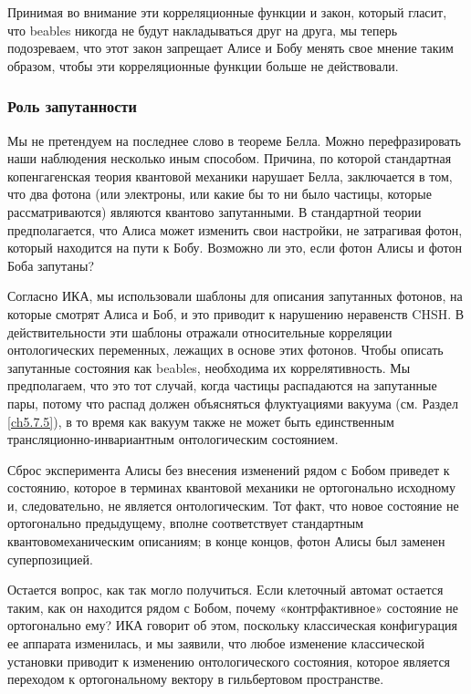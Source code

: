 \documentclass[main.tex]{subfiles}
\begin{document}
Принимая во внимание эти корреляционные функции и закон, который гласит, что beables никогда не будут накладываться друг на друга, мы теперь подозреваем, что этот закон запрещает Алисе и Бобу менять свое мнение таким образом, чтобы эти корреляционные функции больше не действовали.

\subsubsection{Роль запутанности}\label{ch10.3.1}

Мы не претендуем на последнее слово в теореме Белла. Можно перефразировать наши наблюдения несколько иным способом. Причина, по которой стандартная копенгагенская теория квантовой механики нарушает Белла, заключается в том, что два фотона (или электроны, или какие бы то ни было частицы, которые рассматриваются) являются квантово запутанными. В стандартной теории предполагается, что Алиса может изменить свои настройки, не затрагивая фотон, который находится на пути к Бобу. Возможно ли это, если фотон Алисы и фотон Боба запутаны?

Согласно ИКА, мы использовали шаблоны для описания запутанных фотонов, на которые смотрят Алиса и Боб, и это приводит к нарушению неравенств CHSH. В действительности эти шаблоны отражали относительные корреляции онтологических переменных, лежащих в основе этих фотонов. Чтобы описать запутанные состояния как beables, необходима их коррелятивность. Мы предполагаем, что это тот случай, когда частицы распадаются на запутанные пары, потому что распад должен объясняться флуктуациями вакуума (см. Раздел \ref{ch5.7.5}), в то время как вакуум также не может быть единственным трансляционно-инвариантным онтологическим состоянием.

Сброс эксперимента Алисы без внесения изменений рядом с Бобом приведет к состоянию, которое в терминах квантовой механики не ортогонально исходному и, следовательно, не является онтологическим. Тот факт, что новое состояние не ортогонально предыдущему, вполне соответствует стандартным квантовомеханическим описаниям; в конце концов, фотон Алисы был заменен суперпозицией.

Остается вопрос, как так могло получиться. Если клеточный автомат остается таким, как он находится рядом с Бобом, почему «контрфактивное» состояние не ортогонально ему? ИКА говорит об этом, поскольку классическая конфигурация ее аппарата изменилась, и мы заявили, что любое изменение классической установки приводит к изменению онтологического состояния, которое является переходом к ортогональному вектору в гильбертовом пространстве.
\end{document}
